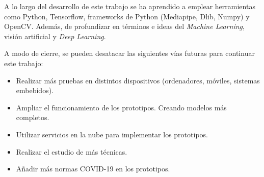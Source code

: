 A lo largo del desarrollo de este trabajo se ha aprendido a emplear herramientas como Python, Tensorflow, frameworks de Python (Mediapipe, Dlib, Numpy) y OpenCV. Además, de profundizar en términos e ideas del \textit{Machine Learning}, visión artificial y \textit{Deep Learning}.

A modo de cierre, se pueden desatacar las siguientes vías futuras para continuar este trabajo:
\begin{itemize}
	\item Realizar más pruebas en distintos dispositivos (ordenadores, móviles, sistemas embebidos).
	\item Ampliar el funcionamiento de los prototipos. Creando modelos más completos.
	\item Utilizar servicios en la nube para implementar los prototipos.
	\item Realizar el estudio de más técnicas.
	\item Añadir más normas COVID-19 en los prototipos.
\end{itemize}